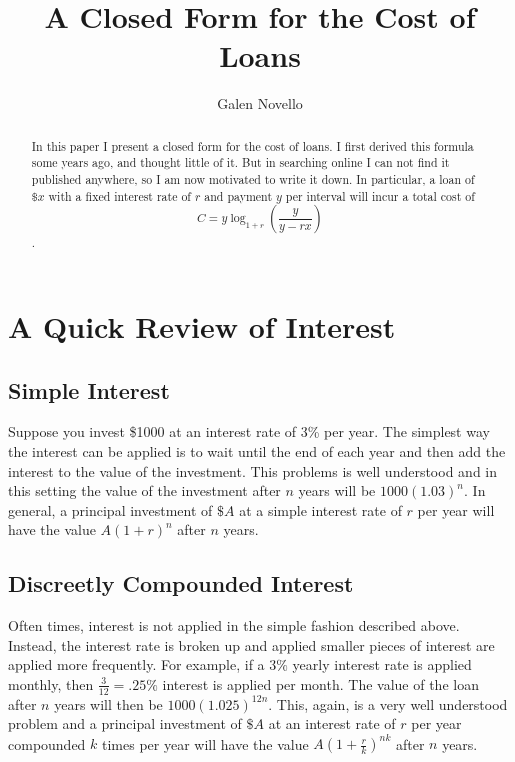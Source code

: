 \documentclass[11pt]{article} %
\title{A Closed Form for the Cost of Loans}
\author{Galen Novello}
\begin{document}
\maketitle

\begin{abstract}
In this paper I present a closed form for the cost of loans.  I first derived this formula some years ago, and thought little of it.  But in searching online I can not find it published anywhere, so I am now motivated to write it down.  In particular, a loan of $\$x $ with a fixed interest rate of $r$ and payment $y$ per interval will incur a total cost of $$C = y\log_{1+r} \left( \frac{y}{y-rx} \right)$$.
\end{abstract}

\section{A Quick Review of Interest}
\subsection{Simple Interest}
Suppose you invest \$1000 at an interest rate of 3\% per year.  The simplest way the interest can be applied is to wait until the end of each year and then add the interest to the value of the investment.  This problems is well understood and in this setting the value of the investment after $n$ years will be $1000(1.03)^{n}$.  In general, a principal investment of $\$A$ at a simple interest rate of $r$ per year will have the value $A(1+r)^n$ after $n$ years.

\subsection{Discreetly Compounded Interest}
Often times, interest is not applied in the simple fashion described above.  Instead, the interest rate is broken up and applied smaller pieces of interest are applied more frequently. For example, if a $3\%$ yearly interest rate is applied monthly, then $\frac{3}{12} = .25\%$ interest is applied per month. The value of the loan after $n$ years will then be $1000(1.025)^{12n}$.  This, again, is a very well understood problem and a principal investment of $\$A$ at an interest rate of $r$ per year compounded $k$ times per year will have the value $A(1+\frac{r}{k})^{nk}$ after $n$ years.
\end{document}
